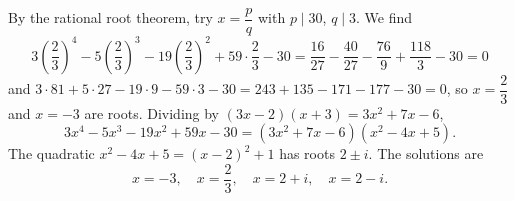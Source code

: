 By the rational root theorem, try $x=\dfrac {p}{q}$ with $p\mid30$, $q\mid3$. We find
\[
3\left(\dfrac{2}{3}\right)^4-5\left(\dfrac{2}{3}\right)^3-19\left(\dfrac{2}{3}\right)^2+59\cdot\dfrac{2}{3}-30=\dfrac{16}{27}-\dfrac{40}{27}-\dfrac{76}{9}+\dfrac{118}{3}-30=0
\]
and $3\cdot81+5\cdot27-19\cdot9-59\cdot3-30=243+135-171-177-30=0$, so $x=\dfrac{2}{3}$ and $x=-3$ are roots. Dividing by $(3x-2)(x+3)=3x^2+7x-6$,
\[
3x^4-5x^3-19x^2+59x-30=(3x^2+7x-6)(x^2-4x+5).
\]
The quadratic $x^2-4x+5=(x-2)^2+1$ has roots $2\pm i$. The solutions are
\[
\boxed{x=-3,\quad x=\dfrac{2}{3},\quad x=2+i,\quad x=2-i} .
\]
